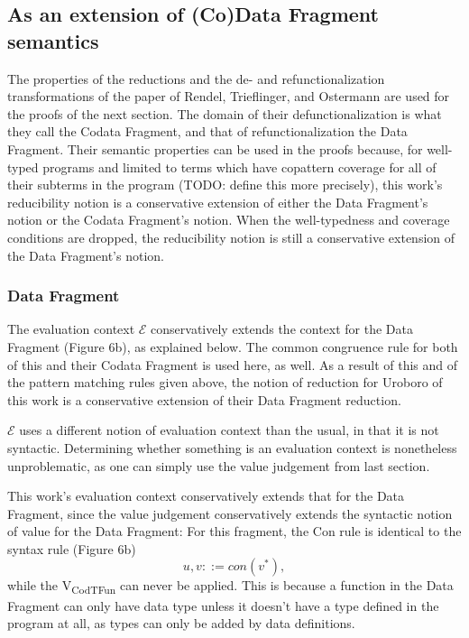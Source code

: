 \documentclass[11pt]{article} %
\begin{document}
\subsection{As an extension of (Co)Data Fragment semantics}

The properties of the reductions and the de- and refunctionalization transformations of the paper of Rendel, Trieflinger, and Ostermann are used for the proofs of the next section. The domain of their defunctionalization is what they call the Codata Fragment, and that of refunctionalization the Data Fragment. Their semantic properties can be used in the proofs because, for well-typed programs and limited to terms which have copattern coverage for all of their subterms in the program (TODO: define this more precisely), this work's reducibility notion is a conservative extension of either the Data Fragment's notion or the Codata Fragment's notion. When the well-typedness and coverage conditions are dropped, the reducibility notion is still a conservative extension of the Data Fragment's notion.

\subsubsection{Data Fragment}

The evaluation context $\mathcal{E}$ conservatively extends the context for the Data Fragment (Figure 6b), as explained below. The common congruence rule for both of this and their Codata Fragment is used here, as well. As a result of this and of the pattern matching rules given above, the notion of reduction for Uroboro of this work is a conservative extension of their Data Fragment reduction.

$\mathcal{E}$ uses a different notion of evaluation context than the usual, in that it is not syntactic. Determining whether something is an evaluation context is nonetheless unproblematic, as one can simply use the value judgement from last section.

This work's evaluation context conservatively extends that for the Data Fragment, since the value judgement conservatively extends the syntactic notion of value for the Data Fragment: For this fragment, the Con rule is identical to the syntax rule (Figure 6b)
\begin{equation*}
u, v ::= con(v^*),
\end{equation*}
while the V\textsubscript{CodTFun} can never be applied. This is because a function in the Data Fragment can only have data type unless it doesn't have a type defined in the program at all, as types can only be added by data definitions.
\end{document}
